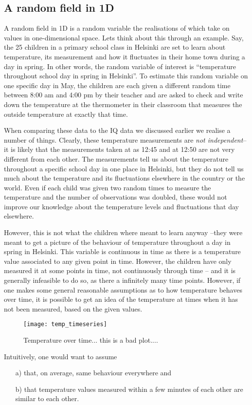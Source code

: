 \subsection{A random field in 1D}
A random field in 1D is a random variable the realisations of which take on values in one-dimensional space. Lets think about this through an example. Say, the 25 children in a primary school class in Helsinki are set to learn about temperature, its measurement and how it fluctuates in their home town during a day in spring. In other words, the random variable of interest is ``temperature throughout school day in spring in Helsinki''.  To estimate this random variable on one specific day in May,  the children are each given a different random time between 8:00 am and 4:00 pm by their teacher and are asked to check and write down the temperature at the thermometer in their classroom that measures the outside temperature at exactly that time. 


When comparing these data to the IQ data we discussed earlier we realise a number of things. Clearly, these temperature measurements are \textit{not independent}--it is likely that the measurements taken at as 12:45 and at 12:50 are not very different from each other. The measurements tell us about the temperature throughout a specific school day in one place in Helsinki, but they do not tell us much about the temperature and its fluctuations elsewhere in the country or the world. Even if each child was given two random times to measure the temperature and the number of observations was doubled, these would not improve our knowledge about the temperature levels and fluctuations that day elsewhere.

However, this is not what the children where meant to learn anyway --they were meant to get a picture of the behaviour of temperature throughout a day in spring in Helsinki. This variable is continuous in time as there is a temperature value associated to any given point in time. However, the children have only measured it at some points in time, not continuously through time -- and it is generally infeasible to do so, as there a infinitely many time points. However, if one makes some general reasonable assumptions as to how temperature behaves over time, it is possible to get an idea of the temperature at times when it has not been measured, based on the given values. 
\begin{figure}
\centering
\texttt{[image: temp\_timeseries]}
\caption{\label{fig:ch2:1D} Temperature over time... this is a bad plot....}
\end{figure}
Intuitively, one would want to assume 
\begin{itemize}
\item[a)]  that, on average, same behaviour everywhere and 
\item[b)] that temperature values measured within a few minutes of each other are similar to each other. 
\end{itemize}


